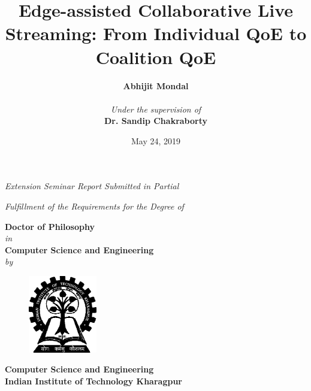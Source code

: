 \title{\bf{Edge-assisted Collaborative Live Streaming: From Individual QoE to Coalition QoE}}
\date{}
\author{}
\maketitle
\thispagestyle{empty}
\begin{center}
	\vspace*{5mm}
	\textit{Extension Seminar Report Submitted in Partial}
	\par
	\vspace*{4mm}
	\textit{Fulfillment of the Requirements for the Degree of}
	\par
	\vspace*{5mm}
	{\large\textbf{Doctor of Philosophy}\\
		\vspace*{2mm}\textit{in}\\
		\vspace*{2mm}\large\textbf{Computer Science and Engineering}
		\\\vspace*{2mm}\textit{by}\\
		\vspace*{2mm}}
	\author{\large\textbf{Abhijit Mondal}\\
		\vspace*{2mm}{\small{[Roll No - 15CS91R09]}}\\
		\vspace*{15mm}\textit{Under the supervision of}\\
		\vspace*{2mm}\textbf{Dr. Sandip Chakraborty}\\}
	\vspace*{30mm}
	\begin{figure}[!ht]
		\centering
		\includegraphics[width=3cm]{img/iit_logo}
	\end{figure}
	\bf{Computer Science and Engineering
		\\Indian Institute of Technology Kharagpur
	}\\
	\date{May 24, 2019}
\end{center}
\newpage
